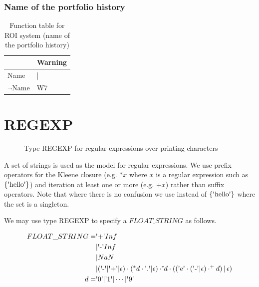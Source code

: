 \documentclass[runningheads,12pt]{article}
\begin{document}
\begin{landscape}
\subsubsection{Name of the portfolio history}

\begin{table}[H]
{
\centering

\begin{tabular}{|l||l|}
\hline
 & Warning\\ 

\hline
Name  & |\\ 

\hline
$\lnot$Name & W7 \\ 

\hline
\end{tabular}

\caption{Function table for ROI system (name of the portfolio history)}
\label{table:ftable_name}
}
\end{table}
\end{landscape}



\newpage
\appendix

\section{REGEXP}

\begin{figure}

\caption{Type REGEXP for regular expressions over printing characters}
\end{figure}

A set of strings is used as the model for regular expressions. We use prefix operators for the Kleene closure (e.g. $*x$ where $x$ is a regular expression such as $\{\squote{hello}\}$) and iteration at least one or more (e.g. $\textrm{+}x$) rather than suffix operators. Note that where there is no confusion we use  instead of $\{\squote{hello}\}$ where the set is a singleton. 

We may use type REGEXP to specify a $FLOAT\_STRING$ as follows.

\begin{align}
FLOAT\_STRING = &\squote{+}Inf\\
&|\squote{-}Inf\\
&|NaN\\
&|(\squote{-}|\squote{+}|\epsilon)\cdot(^*d\cdot\squote{.}|\epsilon)\cdot
	^*\!\!d\cdot ((\squote{e}\cdot(\squote{-}|\epsilon)\cdot^\textrm{+}d)\,|\,\epsilon)\\
d = &\squote{0} | \squote{1} | \cdots |\squote{9} 
\end{align}
\end{document}
